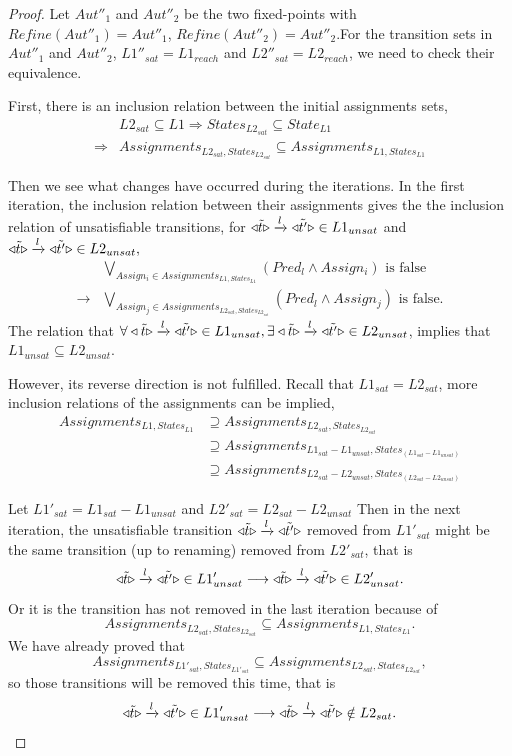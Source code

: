 \documentclass[smallcondensed]{svjour3}
\begin{document}
\begin{proof}
Let $Aut''_1$ and $Aut''_2$ be the two fixed-points with $Refine(Aut''_1) = Aut''_1$, $Refine(Aut''_2) = Aut''_2$.For the transition sets in $Aut''_1$ and $Aut''_2$, $L1''_{sat}=L1_{reach}$ and $L2''_{sat}=L2_{reach}$, we need to check their equivalence.

First, there is an inclusion relation between the initial assignments sets, 
\begin{align*}
&L2_{sat}\subseteq L1\Rightarrow States_{L2_{sat}}\subseteq State_{L1}\\
\Rightarrow &Assignments_{L2_{sat}, States_{L2_{sat}}}\subseteq Assignments_{L1, States_{L1}}
\end{align*}

Then we see what changes have occurred during the iterations. In the first iteration, the inclusion relation between their assignments gives the the inclusion relation of unsatisfiable transitions, for $\triangleleft{\tilde{t}}\triangleright\xrightarrow{l}\triangleleft{\tilde{t'}}\triangleright \in L1_{unsat}$ and $\triangleleft{\tilde{t}}\triangleright\xrightarrow{l}\triangleleft{\tilde{t'}}\triangleright \in L2_{unsat},$
\begin{align*}
&\bigvee_{Assign_i\in Assignments_{L1, States_{L1}}} (Pred_{l}\wedge Assign_i)\text{ is false}\\
\longrightarrow&\bigvee_{Assign_j\in Assignments_{L2_{sat}, States_{L2_{sat}}}} (Pred_{l}\wedge Assign_j)\text{ is false}.
\end{align*}
The relation that $\forall\triangleleft{\tilde{t}}\triangleright\xrightarrow{l}\triangleleft{\tilde{t'}}\triangleright \in L1_{unsat},\exists\triangleleft{\tilde{t}}\triangleright\xrightarrow{l}\triangleleft{\tilde{t'}}\triangleright \in L2_{unsat}$, implies that $L1_{unsat}\subseteq L2_{unsat}.$

However, its reverse direction is not fulfilled. Recall that $L1_{sat}=L2_{sat}$, more inclusion relations of the assignments can be implied,
\begin{align*}
Assignments_{L1, States_{L1}}&\supseteq Assignments_{L2_{sat}, States_{L2_{sat}}}\\
&\supseteq Assignments_{L1_{sat}-L1_{unsat}, States_{(L1_{sat}-L1_{unsat})}}\\
&\supseteq Assignments_{L2_{sat}-L2_{unsat}, States_{(L2_{sat}-L2_{unsat})}}
\end{align*}

Let $L1'_{sat}=L1_{sat}-L1_{unsat}$ and $L2'_{sat}=L2_{sat}-L2_{unsat}$
Then in the next iteration, the unsatisfiable transition $\triangleleft{\tilde{t}}\triangleright\xrightarrow{l}\triangleleft{\tilde{t'}}\triangleright$ removed from $L1'_{sat}$ might be the same transition (up to renaming) removed from $L2'_{sat}$, that is
\[\triangleleft{\tilde{t}}\triangleright\xrightarrow{l}\triangleleft{\tilde{t'}}\triangleright\in L1'_{unsat} \longrightarrow \triangleleft{\tilde{t}}\triangleright\xrightarrow{l}\triangleleft{\tilde{t'}}\triangleright\in L2'_{unsat}.\]
Or it is the transition has not removed in the last iteration because of 
\[Assignments_{L2_{sat}, States_{L2_{sat}}}\subseteq Assignments_{L1, States_{L1}}.\] 
We have already proved that 
\[Assignments_{L1'_{sat}, States_{L1'_{sat}}}\subseteq Assignments_{L2_{sat}, States_{L2_{sat}}},\]
so those transitions will be removed this time, that is
\[\triangleleft{\tilde{t}}\triangleright\xrightarrow{l}\triangleleft{\tilde{t'}}\triangleright\in L1'_{unsat} \longrightarrow \triangleleft{\tilde{t}}\triangleright\xrightarrow{l}\triangleleft{\tilde{t'}}\triangleright\notin L2_{sat}.\]


\end{proof}
\end{document}
